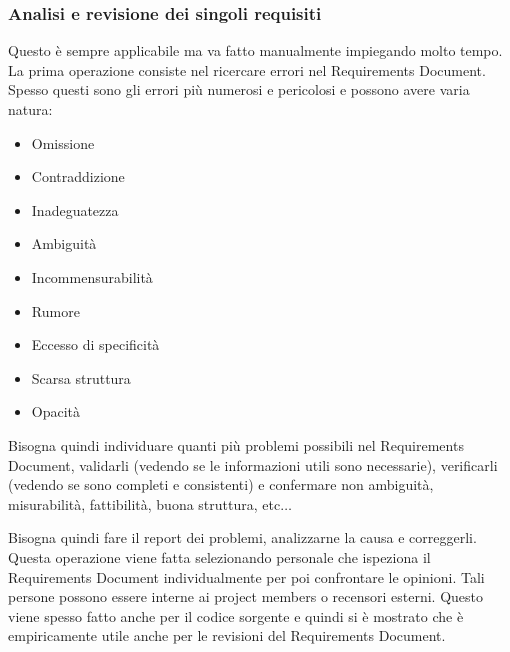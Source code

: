 \subsubsection{Analisi e revisione dei singoli requisiti}
Questo è sempre applicabile ma va fatto manualmente impiegando molto tempo. La
prima operazione consiste nel ricercare errori nel Requirements Document. Spesso
questi sono gli errori più numerosi e pericolosi e possono avere varia natura:
\begin{itemize}
      \item Omissione
      \item Contraddizione
      \item Inadeguatezza
      \item Ambiguità
      \item Incommensurabilità
      \item Rumore
      \item Eccesso di specificità
      \item Scarsa struttura
      \item Opacità
\end{itemize}
Bisogna quindi individuare quanti più problemi possibili nel Requirements Document,
validarli (vedendo se le informazioni utili sono necessarie), verificarli (vedendo
se sono completi e consistenti) e confermare non ambiguità, misurabilità,
fattibilità, buona struttura, etc$\dots$

Bisogna quindi fare il report dei problemi, analizzarne la causa e correggerli.
Questa operazione viene fatta selezionando personale che ispeziona il Requirements
Document individualmente per poi confrontare le opinioni. Tali persone possono
essere interne ai project members o recensori esterni. Questo viene spesso fatto
anche per il codice sorgente e quindi si è mostrato che è empiricamente utile
anche per le revisioni del Requirements Document.


